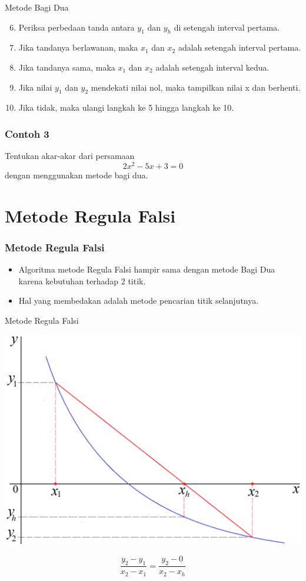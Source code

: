 \documentclass[pdflatex,compress,mathserif]{beamer}
\begin{document}
\begin{frame}{Metode Bagi Dua}
	\begin{enumerate}
		\setcounter{enumi}{5}
		\item Periksa perbedaan tanda antara $ y_1 $ dan $ y_h $ di setengah interval pertama.
		\item Jika tandanya berlawanan, maka $ x_1 $ dan $ x_2 $ adalah setengah interval pertama.
		\item Jika tandanya sama, maka $ x_1 $ dan $ x_2 $ adalah setengah interval kedua.
		\item Jika nilai $ y_1 $ dan $ y_2 $ mendekati nilai nol, maka tampilkan nilai x dan berhenti.
		\item Jika tidak, maka ulangi langkah ke 5 hingga langkah ke 10.
	\end{enumerate}
\end{frame}

\begin{frame}
	\frametitle{Contoh 3}
	Tentukan akar-akar dari persamaan $$ 2x^2 - 5x + 3 = 0 $$ dengan menggunakan metode bagi dua.
\end{frame}

\section{Metode Regula Falsi}

\begin{frame}
	\frametitle{Metode Regula Falsi}
	\begin{itemize}
		\item Algoritma metode Regula Falsi hampir sama dengan metode Bagi Dua karena kebutuhan terhadap 2 titik.
		\item Hal yang membedakan adalah metode pencarian titik selanjutnya.
		
	\end{itemize}
\end{frame}

\begin{frame}{Metode Regula Falsi}
	\begin{center}
		\includegraphics[width=0.7\linewidth]{img/03}
	\end{center}
	$$ \frac{y_2 - y_1}{x_2 - x_1} = \frac{y_2 - 0}{x_2 - x_h} $$
\end{frame}
\end{document}
